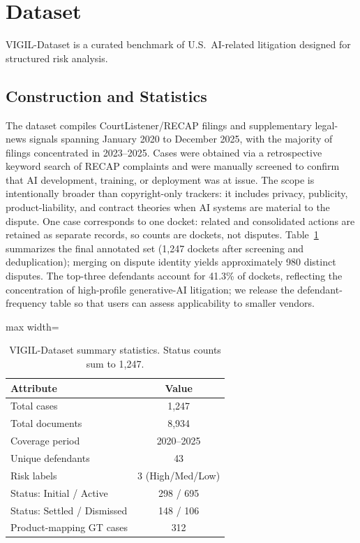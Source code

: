 \section{Dataset}
\label{sec:dataset}

VIGIL-Dataset is a curated benchmark of U.S.\ AI-related litigation designed for structured risk analysis.

\subsection{Construction and Statistics}
\label{sec:construction}

The dataset compiles CourtListener/RECAP filings and supplementary legal-news signals spanning January 2020 to December 2025, with the majority of filings concentrated in 2023--2025.
Cases were obtained via a retrospective keyword search of RECAP complaints and were manually screened to confirm that AI development, training, or deployment was at issue.
The scope is intentionally broader than copyright-only trackers: it includes privacy, publicity, product-liability, and contract theories when AI systems are material to the dispute.
One case corresponds to one docket: related and consolidated actions are retained as separate records, so counts are dockets, not disputes.
Table~\ref{tab:dataset} summarizes the final annotated set (1{,}247 dockets after screening and deduplication); merging on dispute identity yields approximately 980 distinct disputes.
The top-three defendants account for 41.3\% of dockets, reflecting the concentration of high-profile generative-AI litigation; we release the defendant-frequency table so that users can assess applicability to smaller vendors.

\begin{table}[t]
\centering
\small
\begin{adjustbox}{max width=\columnwidth}
\begin{tabular}{lc}
\toprule
Attribute & Value \\
\midrule
Total cases & 1{,}247 \\
Total documents & 8{,}934 \\
Coverage period & 2020--2025 \\
Unique defendants & 43 \\
Risk labels & 3 (High/Med/Low) \\
Status: Initial / Active & 298 / 695 \\
Status: Settled / Dismissed & 148 / 106 \\
Product-mapping GT cases & 312 \\
\bottomrule
\end{tabular}
\end{adjustbox}
\caption{VIGIL-Dataset summary statistics.
Status counts sum to 1{,}247.}
\label{tab:dataset}
\end{table}


